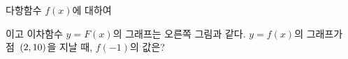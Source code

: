 \noindent\begin{minipage}[t]{0.58\linewidth}\vspace{0pt}\raggedright 다항함수 $f(x)$에 대하여\par\smallskip\end{minipage}\hfill\begin{minipage}[t]{0.4\linewidth}\vspace{0pt}\centering \resizebox{\ifdim\width>\linewidth\linewidth\else\width\fi}{!}{}\end{minipage}\par
\noindent {}\par\smallskip\noindent 이고 이차함수 $y=F(x)$의 그래프는 오른쪽 그림과 같다. $y=f(x)$의 그래프가 점~$(2{,}\mkern3mu\mathopen{}10)$을 지날 때, $f(-1)$의 값은?
